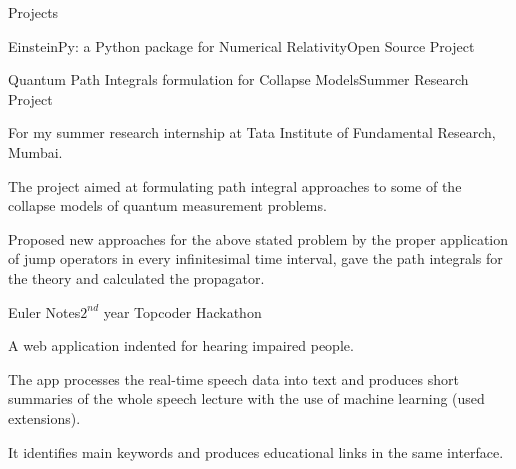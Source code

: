 \documentclass{resume} %
\begin{document}
\begin{rSection}{Projects}
\begin{rSubsection}{EinsteinPy: a Python package for Numerical Relativity}{Open Source Project}{}{}
\end{rSubsection}

\begin{rSubsection}{Quantum Path Integrals formulation for Collapse Models}{Summer Research Project}{}{}
\item For my summer research internship at Tata Institute of Fundamental Research, Mumbai.
    \item The project aimed at formulating path integral approaches to some of the collapse models of quantum measurement problems.
    \item Proposed new approaches for the above stated problem by the proper application of jump operators in every infinitesimal time interval, gave the path integrals for the theory and calculated the propagator.
\end{rSubsection}

\begin{rSubsection}{Euler Notes}{$2^{nd}$ year Topcoder Hackathon}{}{}
\item A web application indented for hearing impaired people. 
\item The app processes the real-time speech data into text and produces short summaries of the whole speech lecture with the use of machine learning (used extensions). 
\item It identifies main keywords and produces educational links in the same interface.
\end{rSubsection}

\end{rSection}

\end{document}
